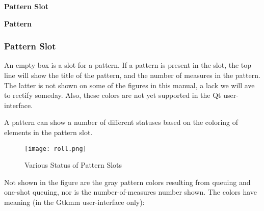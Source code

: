    \begin{enumber}
      \item \textbf{Pattern Slot}
      \item \textbf{Pattern}
   \end{enumber}

\subsubsection{Pattern Slot}
\label{subsubsec:patterns_pattern_slot}

   An empty box is a slot for a pattern.
   If a pattern is present in the slot, the top line will show
   the title of the pattern, and the number of measures in the pattern.
   The latter is not shown on some of the figures in this manual, a
   lack we will ave to rectify someday.
   Also, these colors are not yet supported in the Qt user-interface.

   A pattern can show a number of different statuses based on the coloring
   of elements in the pattern slot. 

\begin{figure}[H]
   \centering 
   \texttt{[image: roll.png]}
   \caption{Various Status of Pattern Slots}
   \label{fig:pattern_slots_statuses}
\end{figure}

   Not shown in the figure are the gray pattern
   colors resulting from queuing and one-shot queuing, nor is the
   number-of-measures number shown.
   The colors have meaning (in the Gtkmm user-interface only):

